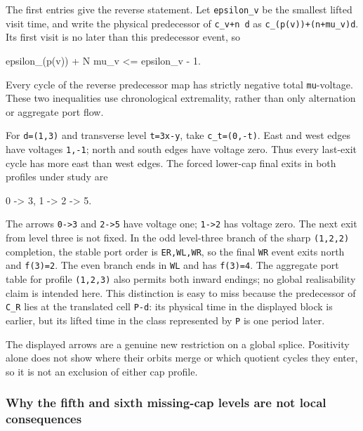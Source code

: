 \documentclass[11pt,letterpaper]{article}
\theoremstyle{plain}
\theoremstyle{definition}
\begin{document}
\begin{NoHyper}
The first entries give the reverse statement. Let \texttt{epsilon\_v} be the smallest lifted visit time, and write the physical predecessor of \texttt{c\_v+n\ d} as \texttt{c\_(p(v))+(n+mu\_v)d}. Its first visit is no later than this predecessor event, so

\begin{codeblock}
epsilon_(p(v)) + N mu_v <= epsilon_v - 1.
\end{codeblock}

Every cycle of the reverse predecessor map has strictly negative total \texttt{mu}-voltage. These two inequalities use chronological extremality, rather than only alternation or aggregate port flow.

For \texttt{d=(1,3)} and transverse level \texttt{t=3x-y}, take \texttt{c\_t=(0,-t)}. East and west edges have voltages \texttt{1,-1}; north and south edges have voltage zero. Thus every last-exit cycle has more east than west edges. The forced lower-cap final exits in both profiles under study are

\begin{codeblock}
0 -> 3,          1 -> 2 -> 5.
\end{codeblock}

The arrows \texttt{0-\textgreater{}3} and \texttt{2-\textgreater{}5} have voltage one; \texttt{1-\textgreater{}2} has voltage zero. The next exit from level three is not fixed. In the odd level-three branch of the sharp \texttt{(1,2,2)} completion, the stable port order is \texttt{ER,WL,WR}, so the final \texttt{WR} event exits north and \texttt{f(3)=2}. The even branch ends in \texttt{WL} and has \texttt{f(3)=4}. The aggregate port table for profile \texttt{(1,2,3)} also permits both inward endings; no global realisability claim is intended here. This distinction is easy to miss because the predecessor of \texttt{C\_R} lies at the translated cell \texttt{P-d}: its physical time in the displayed block is earlier, but its lifted time in the class represented by \texttt{P} is one period later.

The displayed arrows are a genuine new restriction on a global splice. Positivity alone does not show where their orbits merge or which quotient cycles they enter, so it is not an exclusion of either cap profile.

\subsubsection{Why the fifth and sixth missing-cap levels are not local consequences}


\end{NoHyper}
\end{document}
